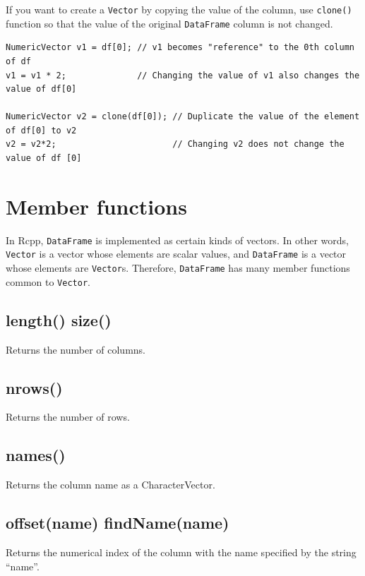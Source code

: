 \documentclass[]{book}
\theoremstyle{definition}
\theoremstyle{definition}
\theoremstyle{remark}
\begin{document}
If you want to create a \texttt{Vector} by copying the value of the
column, use \texttt{clone()} function so that the value of the original
\texttt{DataFrame} column is not changed.

\begin{verbatim}
NumericVector v1 = df[0]; // v1 becomes "reference" to the 0th column of df
v1 = v1 * 2;              // Changing the value of v1 also changes the value of df[0]

NumericVector v2 = clone(df[0]); // Duplicate the value of the element of df[0] to v2
v2 = v2*2;                       // Changing v2 does not change the value of df [0]
\end{verbatim}

\section{Member functions}\label{member-functions-2}

In Rcpp, \texttt{DataFrame} is implemented as certain kinds of vectors.
In other words, \texttt{Vector} is a vector whose elements are scalar
values, and \texttt{DataFrame} is a vector whose elements are
\texttt{Vector}s. Therefore, \texttt{DataFrame} has many member
functions common to \texttt{Vector}.

\subsection{length() size()}\label{length-size-1}

Returns the number of columns.

\subsection{nrows()}\label{nrows}

Returns the number of rows.

\subsection{names()}\label{names-1}

Returns the column name as a CharacterVector.

\subsection{offset(name) findName(name)}\label{offsetname-findnamename}

Returns the numerical index of the column with the name specified by the
string ``name''.
\end{document}
